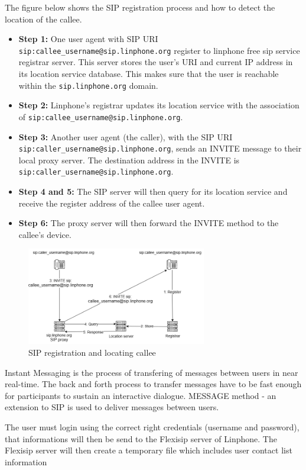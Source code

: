    \noindent The figure below shows the SIP registration process and how to detect the location of the callee. 
    \sloppy
    \begin{itemize}
        \item \textbf {Step 1:} One user agent with SIP URI \texttt{sip:callee\_username@sip.linphone.org} register to linphone free sip service registrar server. 
        This server stores the user’s URI and current IP address in its location service database. 
        This makes sure that the user is reachable within the \texttt{sip.linphone.org} domain. 
        \item \textbf {Step 2:} Linphone’s registrar updates its location service with the association of \texttt{sip:\allowbreak callee\_username@sip.linphone.org}.
        \item \textbf {Step 3:} Another user agent (the caller), with the SIP URI \texttt{\allowbreak sip:caller\_username\allowbreak @sip.linphone.org}, 
        sends an INVITE message to their local proxy server. 
        The destination address in the INVITE is \texttt{sip:caller\_username@sip.linphone.org}.
        \item \textbf {Step 4 and 5:} The SIP server will then query for its location service and receive the register address of the callee user agent.
        \item \textbf {Step 6:} The proxy server will then forward the INVITE method to the callee’s device. 
    \end{itemize}

    \begin{figure}[H]
        \centering
        \includegraphics[width=0.7\textwidth]{image/Locating_calllee.png} 
        \caption{SIP registration and locating callee}
        \label{fig:locating_callee}
    \end{figure}

    Instant Messaging is the process of transfering of messages between users in near real-time.
    The back and forth process to transfer messages have to be fast enough for participants to sustain an interactive dialogue.
    MESSAGE method - an extension to SIP is used to deliver messages between users. 

    \noindent The user must login using the correct right credentials (username and password), that informations will then be send to the Flexisip server of Linphone.
    The Flexisip server will then create a temporary file which includes user contact list information 